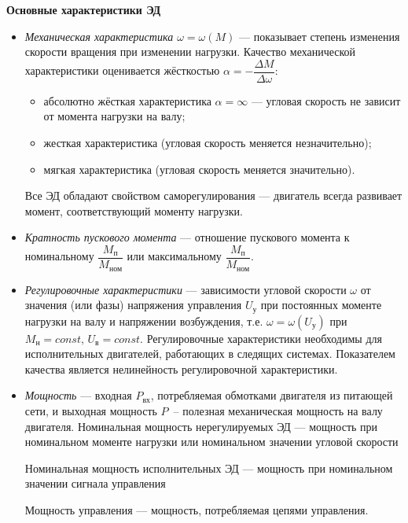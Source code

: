 \begin{flushleft}
	\textbf{Основные характеристики ЭД}
\end{flushleft}
\begin{itemize}
	\item \textit{Механическая характеристика $ \omega = \omega (M) $} --- показывает степень изменения скорости вращения при изменении нагрузки.
Качество механической характеристики оценивается жёсткостью $ \alpha = -\dfrac{\Delta M}{\Delta \omega} $:
	\begin{itemize}
	\item абсолютно жёсткая характеристика $ \alpha = \infty $ --- угловая скорость не зависит от момента нагрузки на валу;
	\item жесткая характеристика (угловая скорость меняется незначительно);
	\item мягкая характеристика (угловая скорость меняется значительно).	
	\end{itemize}

Все ЭД обладают свойством саморегулирования --- двигатель всегда развивает момент, соответствующий моменту нагрузки.

	\item \textit{Кратность пускового момента} --- отношение пускового момента к номинальному $ \dfrac{M_\text{п}}{M_\text{ном}} $ или максимальному $ \dfrac{M_\text{п}}{M_\text{ном}} $.

	\item \textit{Регулировочные характеристики} --- зависимости угловой скорости $ \omega $ от значения (или фазы) напряжения управления $ U_\text{у} $ при постоянных моменте нагрузки на валу и напряжении возбуждения, т.е. $ \omega = \omega (U_\text{у}) $ при $ M_\text{н} = const, \, U_\text{в} = const $.
Регулировочные характеристики необходимы для исполнительных двигателей, работающих в следящих системах. Показателем качества является нелинейность регулировочной характеристики.

	\item \textit{Мощность} --- входная $ P_\text{вх} $, потребляемая обмотками двигателя из питающей сети, и выходная мощность $ P $~-- полезная механическая мощность на валу двигателя.
Номинальная мощность нерегулируемых ЭД --- мощность при номинальном моменте нагрузки или номинальном значении угловой скорости

Номинальная мощность исполнительных ЭД --- мощность при номинальном значении сигнала управления

Мощность управления --- мощность, потребляемая цепями управления.


\end{itemize}
